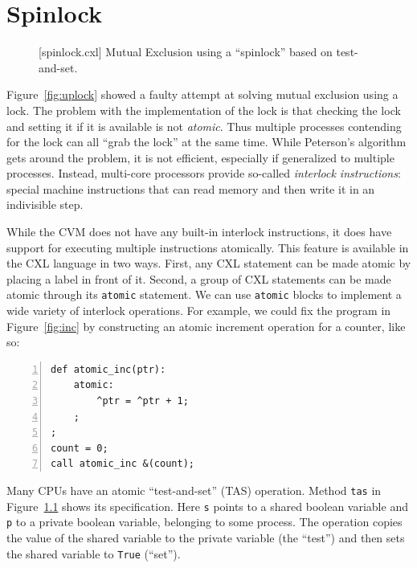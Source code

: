 \documentclass{report}
\newenvironment{code}{
\tcolorbox
}{
\endtcolorbox
}
\begin{document}
\chapter{Spinlock}
\label{ch:spinlock}

\begin{figure}
\begin{code}
\end{code}
\caption{[spinlock.cxl] Mutual Exclusion using a ``spinlock'' based on test-and-set.}
\label{fig:tas}
\end{figure}

Figure~\ref{fig:uplock} showed a faulty attempt at solving mutual
exclusion using a lock.  The problem with the implementation of the
lock is that checking the lock and setting it if it is available is
not \emph{atomic}.  Thus multiple processes contending for the lock
can all ``grab the lock'' at the same time.  While Peterson's
algorithm gets around the problem, it is not efficient, especially
if generalized to multiple processes.  Instead, multi-core processors provide
so-called \emph{interlock instructions}:
special machine instructions
that can read memory and then write it in an indivisible step.

While the CVM does not have any built-in interlock instructions,
it does have support for executing multiple instructions atomically.
This feature is available in the CXL language in two ways.
First, any CXL statement can be made atomic by placing a label in front
of it.  Second, a group of CXL statements can be made atomic
through its \texttt{atomic}
statement.
We can use \texttt{atomic} blocks to implement a wide variety of
interlock operations.
For example, we could fix the program in Figure~\ref{fig:inc} by
constructing an atomic increment operation for a counter, like so:
\begin{code}
\begin{Verbatim}[xleftmargin=5mm,numbers=left]
def atomic_inc(ptr):
    atomic:
        ^ptr = ^ptr + 1;
    ;
;
count = 0;
call atomic_inc &(count);
\end{Verbatim}
\end{code}

Many CPUs have an atomic ``test-and-set'' (TAS)
operation.
Method \texttt{tas} in Figure~\ref{fig:tas} shows its specification.
Here \texttt{s} points to a shared boolean variable and \texttt{p}
to a private boolean variable, belonging to some process.
The operation copies the value of the shared variable to the
private variable (the ``test'')
and then sets the shared variable to \texttt{True} (``set'').
\end{document}
